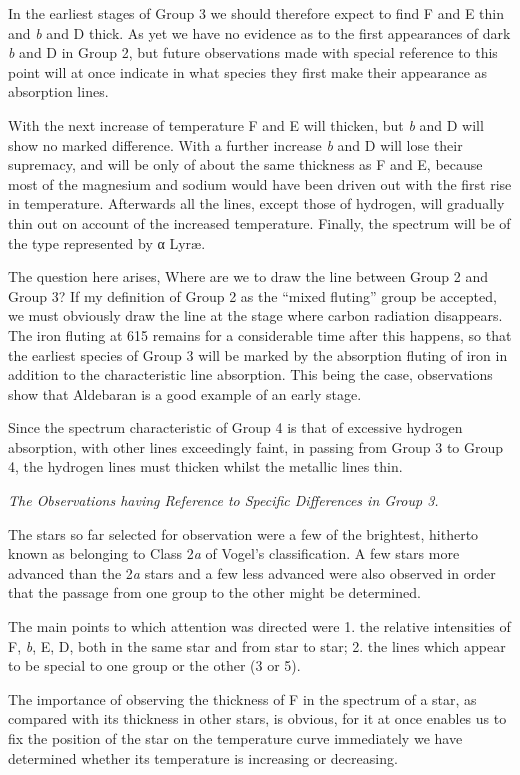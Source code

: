 \documentclass[a4paper, 12pt, oneside, polutonikogreek, english]{article}
\begin{document}
In the earliest stages of Group 3 we should therefore expect to find F and E thin and \emph{b} and D thick. As yet we have no evidence as to the first appearances of dark \emph{b} and D in Group 2, but future observations made with special reference to this point will at once indicate in what species they first make their appearance as absorption lines.

With the next increase of temperature F and E will thicken, but \emph{b} and D will show no marked difference. With a further increase \emph{b} and D will lose their supremacy, and will be only of about the same thickness as F and E, because most of the magnesium and sodium would have been driven out with the first rise in temperature. Afterwards all the lines, except those of hydrogen, will gradually thin out on account of the increased temperature. Finally, the spectrum will be of the type represented by α Lyræ.

The question here arises, Where are we to draw the line between Group 2 and Group 3? If my definition of Group 2 as the ``mixed fluting'' group be accepted, we must obviously draw the line at the stage where carbon radiation disappears. The iron fluting at 615 remains for a considerable time after this happens, so that the earliest species of Group 3 will be marked by the absorption fluting of iron in addition to the characteristic line absorption. This being the case, observations show that Aldebaran is a good example of an early stage.

Since the spectrum characteristic of Group 4 is that of excessive hydrogen absorption, with other lines exceedingly faint, in passing from Group 3 to Group 4, the hydrogen lines must thicken whilst the metallic lines thin.

\emph{The Observations having Reference to Specific Differences in Group 3.}

The stars so far selected for observation were a few of the brightest, hitherto known as belonging to Class 2\emph{a} of Vogel's classification. A few stars more advanced than the 2\emph{a} stars and a few less advanced were also observed in order that the passage from one group to the other might be determined.

The main points to which attention was directed were 1. the relative intensities of F, \emph{b}, E, D, both in the same star and from star to star; 2. the lines which appear to be special to one group or the other (3 or 5).

The importance of observing the thickness of F in the spectrum of a star, as compared with its thickness in other stars, is obvious, for it at once enables us to fix the position of the star on the temperature curve immediately we have determined whether its temperature is increasing or decreasing.
\end{document}
